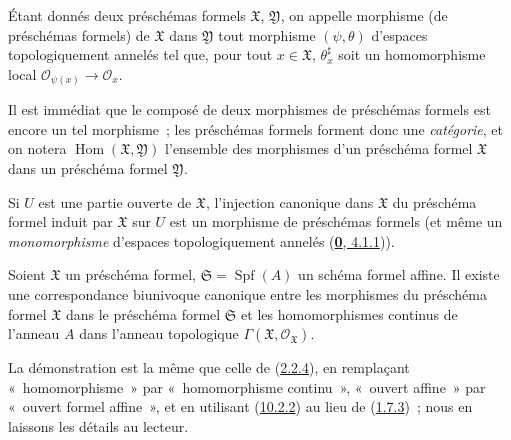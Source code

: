 \begin{definition}[10.4.5]
\label{I.10.4.5-fr}
Étant donnés deux préschémas formels $\mathfrak{X}$, $\mathfrak{Y}$, on
appelle morphisme (de préschémas formels) de $\mathfrak{X}$ dans
$\mathfrak{Y}$ tout morphisme $(\psi,\theta)$ d'espaces topologiquement
annelés tel que, pour tout $x\in\mathfrak{X}$, $\theta_x^\sharp$ soit un
homomorphisme local
$\mathscr{O}_{\psi(x)}\to\mathscr{O}_x$.
\end{definition}

Il est immédiat que le composé de deux morphismes de préschémas formels est
encore un tel morphisme~; les préschémas formels forment donc une
\emph{catégorie}, et on notera
$\operatorname{Hom}(\mathfrak{X},\mathfrak{Y})$ l'ensemble des morphismes
d'un préschéma formel $\mathfrak{X}$ dans un préschéma formel
$\mathfrak{Y}$.

Si $U$ est une partie ouverte de $\mathfrak{X}$, l'injection canonique
dans $\mathfrak{X}$ du préschéma formel induit par $\mathfrak{X}$ sur $U$
est un morphisme de préschémas formels (et même un
\emph{monomorphisme} d'espaces topologiquement annelés
(\hyperref[0.4.1.1-fr]{\textbf{0}, 4.1.1})).

\begin{proposition}[10.4.6]
\label{I.10.4.6-fr}
Soient $\mathfrak{X}$ un préschéma formel,
$\mathfrak{S}=\operatorname{Spf}(A)$ un schéma formel affine. Il existe
une correspondance biunivoque canonique entre les morphismes du préschéma
formel $\mathfrak{X}$ dans le préschéma formel $\mathfrak{S}$ et les
homomorphismes continus de l'anneau $A$ dans l'anneau topologique
$\Gamma(\mathfrak{X},\mathscr{O}_{\mathfrak{X}})$.
\end{proposition}

La démonstration est la même que celle de
(\hyperref[I.2.2.4-fr]{2.2.4}), en remplaçant «~homomorphisme~» par
«~homomorphisme continu~», «~ouvert affine~» par «~ouvert formel
affine~», et en utilisant (\hyperref[I.10.2.2-fr]{10.2.2}) au lieu de
(\hyperref[I.1.7.3-fr]{1.7.3})~; nous en laissons les détails au lecteur.

